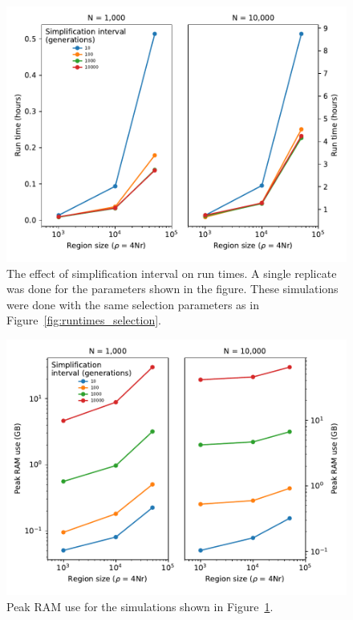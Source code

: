 \documentclass{article}
\begin{document}
\begin{figure}[!h]
    \includegraphics{sims/gc_interval/GCtime}
    \caption{\label{sfig:gctime}The effect of simplification interval on run times.  A single replicate was done for the
        parameters shown in the figure.  These simulations were done with the same selection parameters as in
    Figure~\ref{fig:runtimes_selection}.}
\end{figure}

\begin{figure}[!h]
    \includegraphics{sims/gc_interval/GCmem}
    \caption{\label{sfig:gcmem}Peak RAM use for the simulations shown in Figure~\ref{sfig:gctime}.}
\end{figure}
\end{document}
